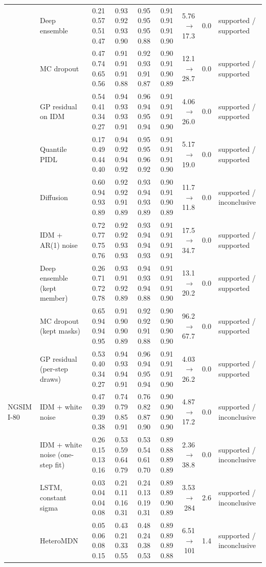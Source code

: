 \begin{longtable}{llrrrrrrl}
 & Deep ensemble & 0.21 0.57 0.51 0.47 & 0.93 0.92 0.93 0.90 & 0.95 0.95 0.95 0.88 & 0.91 0.91 0.91 0.90 & 5.76 $\rightarrow$ 17.3 & 0.0 & supported / supported \\
 & MC dropout & 0.47 0.74 0.65 0.56 & 0.91 0.91 0.91 0.88 & 0.92 0.93 0.91 0.87 & 0.90 0.91 0.90 0.89 & 12.1 $\rightarrow$ 28.7 & 0.0 & supported / supported \\
 & GP residual on IDM & 0.54 0.41 0.34 0.27 & 0.94 0.93 0.93 0.91 & 0.96 0.94 0.95 0.94 & 0.91 0.91 0.91 0.90 & 4.06 $\rightarrow$ 26.0 & 0.0 & supported / supported \\
 & Quantile PIDL & 0.17 0.49 0.44 0.40 & 0.94 0.92 0.94 0.92 & 0.95 0.95 0.96 0.92 & 0.91 0.91 0.91 0.90 & 5.17 $\rightarrow$ 19.0 & 0.0 & supported / supported \\
 & Diffusion & 0.60 0.94 0.93 0.89 & 0.92 0.92 0.91 0.89 & 0.93 0.94 0.93 0.89 & 0.90 0.91 0.90 0.89 & 11.7 $\rightarrow$ 11.8 & 0.0 & supported / inconclusive \\
 & IDM + AR(1) noise & 0.72 0.77 0.75 0.76 & 0.92 0.92 0.93 0.93 & 0.93 0.94 0.94 0.93 & 0.91 0.91 0.91 0.91 & 17.5 $\rightarrow$ 34.7 & 0.0 & supported / supported \\
 & Deep ensemble (kept member) & 0.26 0.71 0.72 0.78 & 0.93 0.91 0.92 0.89 & 0.94 0.93 0.94 0.88 & 0.91 0.91 0.91 0.90 & 13.1 $\rightarrow$ 20.2 & 0.0 & supported / supported \\
 & MC dropout (kept masks) & 0.65 0.94 0.94 0.95 & 0.91 0.90 0.90 0.89 & 0.92 0.92 0.91 0.88 & 0.90 0.90 0.90 0.90 & 96.2 $\rightarrow$ 67.7 & 0.0 & supported / supported \\
 & GP residual (per-step draws) & 0.53 0.40 0.34 0.27 & 0.94 0.93 0.94 0.91 & 0.96 0.94 0.95 0.94 & 0.91 0.91 0.91 0.90 & 4.03 $\rightarrow$ 26.2 & 0.0 & supported / supported \\
\midrule
NGSIM I-80 & IDM + white noise & 0.47 0.39 0.39 0.38 & 0.74 0.79 0.85 0.91 & 0.76 0.82 0.87 0.90 & 0.90 0.90 0.90 0.90 & 4.87 $\rightarrow$ 17.2 & 0.0 & supported / inconclusive \\
 & IDM + white noise (one-step fit) & 0.26 0.15 0.13 0.16 & 0.53 0.59 0.64 0.79 & 0.53 0.54 0.61 0.70 & 0.89 0.88 0.89 0.89 & 2.36 $\rightarrow$ 38.8 & 0.0 & supported / inconclusive \\
 & LSTM, constant sigma & 0.03 0.04 0.04 0.08 & 0.21 0.11 0.16 0.31 & 0.24 0.13 0.19 0.31 & 0.89 0.89 0.90 0.89 & 3.53 $\rightarrow$ 284 & 2.6 & supported / inconclusive \\
 & HeteroMDN & 0.05 0.06 0.08 0.15 & 0.43 0.21 0.33 0.55 & 0.48 0.24 0.38 0.53 & 0.89 0.89 0.89 0.88 & 6.51 $\rightarrow$ 101 & 1.4 & supported / inconclusive \\

\end{longtable}
